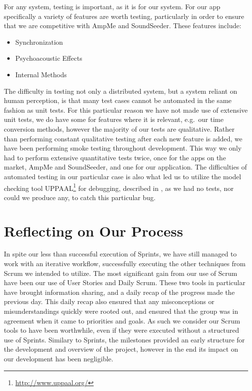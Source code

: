 \bigskip
For any system, testing is important, as it is for our system.
For our app specifically a variety of features are worth testing, particularly in order to ensure that we are competitive with AmpMe and SoundSeeder.
These features include:
\begin{multicols}{3}
\begin{itemize}
    \item Synchronization
    \item Psychoacoustic Effects
    \item Internal Methods
\end{itemize}
\end{multicols}

The difficulty in testing not only a distributed system, but a system reliant on human perception, is that many test cases cannot be automated in the same fashion as unit tests.
For this particular reason we have not made use of extensive unit tests, we do have some for features where it is relevant, e.g.\ our time conversion methods, however the majority of our tests are qualitative.
Rather than performing constant qualitative testing after each new feature is added, we have been performing smoke testing throughout development.
This way we only had to perform extensive quantitative tests twice, once for the apps on the market, AmpMe and SoundSeeder, and one for our application.
The difficulties of automated testing in our particular case is also what led us to utilize the model checking tool UPPAAL\footnote{\url{http://www.uppaal.org/}} for debugging, described in , as we had no tests, nor could we produce any, to catch this particular bug.

\section{Reflecting on Our Process}
In spite our less than successful execution of Sprints, we have still managed to work with an iterative workflow, successfully executing the other techniques from Scrum we intended to utilize.
The most significant gain from our use of Scrum have been our use of User Stories and Daily Scrum.
These two tools in particular have brought information sharing, and a daily recap of the progress made the previous day.
This daily recap also ensured that any misconceptions or misunderstandings quickly were rooted out, and ensured that the group was in agreement when it came to priorities and goals.
As such we consider our Scrum tools to have been worthwhile, even if they were executed without a structured use of Sprints.
Similary to Sprints, the milestones provided an early structure for the development and overview of the project, however in the end its impact on our development has been negligible.

